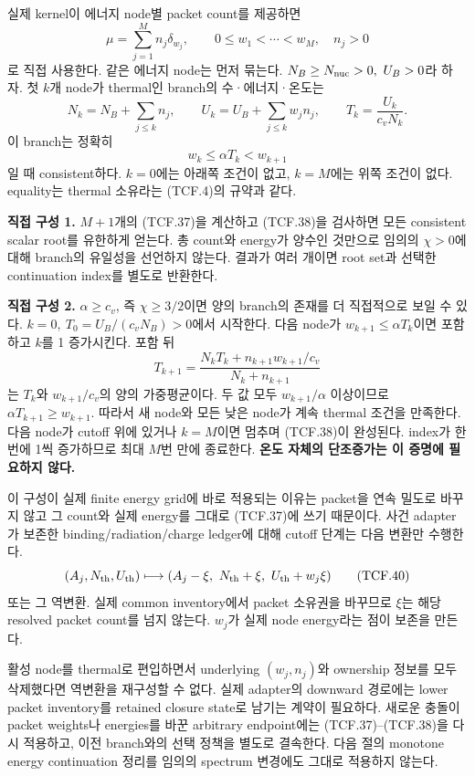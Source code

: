 \documentclass[11pt,a4paper]{article}
\begin{document}
실제 kernel이 에너지 node별 packet count를 제공하면 \[
\mu=\sum_{j=1}^{M}n_j\delta_{w_j},\qquad
0\le w_1<\cdots<w_M,\quad n_j>0
\tag{TCF.36}
\] 로 직접 사용한다. 같은 에너지 node는 먼저 묶는다. \(N_B\ge N_{\rm nuc}>0,\ U_B>0\)라 하자. 첫 \(k\)개 node가 thermal인 branch의 수·에너지·온도는 \[
N_k=N_B+\sum_{j\le k}n_j,\qquad
U_k=U_B+\sum_{j\le k}w_jn_j,\qquad
T_k=\frac{U_k}{c_vN_k}.
\tag{TCF.37}
\] 이 branch는 정확히 \[
w_k\le\alpha T_k<w_{k+1}
\tag{TCF.38}
\] 일 때 consistent하다. \(k=0\)에는 아래쪽 조건이 없고, \(k=M\)에는 위쪽 조건이 없다. equality는 thermal 소유라는 (TCF.4)의 규약과 같다.

\textbf{직접 구성 1.} \(M+1\)개의 (TCF.37)을 계산하고 (TCF.38)을 검사하면 모든 consistent scalar root를 유한하게 얻는다. 총 count와 energy가 양수인 것만으로 임의의 \(\chi>0\)에 대해 branch의 유일성을 선언하지 않는다. 결과가 여러 개이면 root set과 선택한 continuation index를 별도로 반환한다.

\textbf{직접 구성 2.} \(\alpha\ge c_v\), 즉 \(\chi\ge3/2\)이면 양의 branch의 존재를 더 직접적으로 보일 수 있다. \(k=0,\ T_0=U_B/(c_vN_B)>0\)에서 시작한다. 다음 node가 \(w_{k+1}\le\alpha T_k\)이면 포함하고 \(k\)를 1 증가시킨다. 포함 뒤 \[
T_{k+1}
=\frac{N_kT_k+n_{k+1}w_{k+1}/c_v}{N_k+n_{k+1}}
\tag{TCF.39}
\] 는 \(T_k\)와 \(w_{k+1}/c_v\)의 양의 가중평균이다. 두 값 모두 \(w_{k+1}/\alpha\) 이상이므로 \(\alpha T_{k+1}\ge w_{k+1}\). 따라서 새 node와 모든 낮은 node가 계속 thermal 조건을 만족한다. 다음 node가 cutoff 위에 있거나 \(k=M\)이면 멈추며 (TCF.38)이 완성된다. index가 한 번에 1씩 증가하므로 최대 \(M\)번 만에 종료한다. \textbf{온도 자체의 단조증가는 이 증명에 필요하지 않다.}

이 구성이 실제 finite energy grid에 바로 적용되는 이유는 packet을 연속 밀도로 바꾸지 않고 그 count와 실제 energy를 그대로 (TCF.37)에 쓰기 때문이다. 사건 adapter가 보존한 binding/radiation/charge ledger에 대해 cutoff 단계는 다음 변환만 수행한다. \[
(A_j,N_{\rm th},U_{\rm th})
\longmapsto
(A_j-\xi,\ N_{\rm th}+\xi,\ U_{\rm th}+w_j\xi)
\tag{TCF.40}
\] 또는 그 역변환. 실제 common inventory에서 packet 소유권을 바꾸므로 \(\xi\)는 해당 resolved packet count를 넘지 않는다. \(w_j\)가 실제 node energy라는 점이 보존을 만든다.

활성 node를 thermal로 편입하면서 underlying \((w_j,n_j)\)와 ownership 정보를 모두 삭제했다면 역변환을 재구성할 수 없다. 실제 adapter의 downward 경로에는 lower packet inventory를 retained closure state로 남기는 계약이 필요하다. 새로운 충돌이 packet weights나 energies를 바꾼 arbitrary endpoint에는 (TCF.37)--(TCF.38)을 다시 적용하고, 이전 branch와의 선택 정책을 별도로 결속한다. 다음 절의 monotone energy continuation 정리를 임의의 spectrum 변경에도 그대로 적용하지 않는다.
\end{document}
